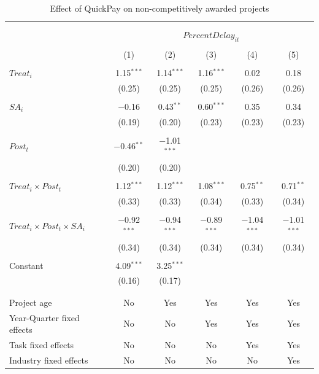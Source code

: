 \documentclass[
]{article}
\begin{document}
\begin{table}[H] \centering 
  \caption{Effect of QuickPay on non-competitively awarded projects} 
  \label{} 
\small 
\begin{tabular}{@{\extracolsep{-2pt}}lccccc} 
\\[-1.8ex]\hline 
\hline \\[-1.8ex] 
\\[-1.8ex] & \multicolumn{5}{c}{$PercentDelay_{it}$  } \\ 
\\[-1.8ex] & (1) & (2) & (3) & (4) & (5)\\ 
\hline \\[-1.8ex] 
 $Treat_i$ & 1.15$^{***}$ & 1.14$^{***}$ & 1.16$^{***}$ & 0.02 & 0.18 \\ 
  & (0.25) & (0.25) & (0.25) & (0.26) & (0.26) \\ 
  & & & & & \\ 
 $SA_i$ & $-$0.16 & 0.43$^{**}$ & 0.60$^{***}$ & 0.35 & 0.34 \\ 
  & (0.19) & (0.20) & (0.23) & (0.23) & (0.23) \\ 
  & & & & & \\ 
 $Post_t$ & $-$0.46$^{**}$ & $-$1.01$^{***}$ &  &  &  \\ 
  & (0.20) & (0.20) &  &  &  \\ 
  & & & & & \\ 
 $Treat_i \times Post_t$ & 1.12$^{***}$ & 1.12$^{***}$ & 1.08$^{***}$ & 0.75$^{**}$ & 0.71$^{**}$ \\ 
  & (0.33) & (0.33) & (0.34) & (0.33) & (0.34) \\ 
  & & & & & \\ 
 $Treat_i \times Post_t \times SA_i $ & $-$0.92$^{***}$ & $-$0.94$^{***}$ & $-$0.89$^{***}$ & $-$1.04$^{***}$ & $-$1.01$^{***}$ \\ 
  & (0.34) & (0.34) & (0.34) & (0.34) & (0.34) \\ 
  & & & & & \\ 
 Constant & 4.09$^{***}$ & 3.25$^{***}$ &  &  &  \\ 
  & (0.16) & (0.17) &  &  &  \\ 
  & & & & & \\ 
\hline \\[-1.8ex] 
Project age & No & Yes & Yes & Yes & Yes \\ 
Year-Quarter fixed effects & No & No & Yes & Yes & Yes \\ 
Task fixed effects & No & No & No & Yes & Yes \\ 
Industry fixed effects & No & No & No & No & Yes \\ 

\end{tabular}
\end{table}
\end{document}
